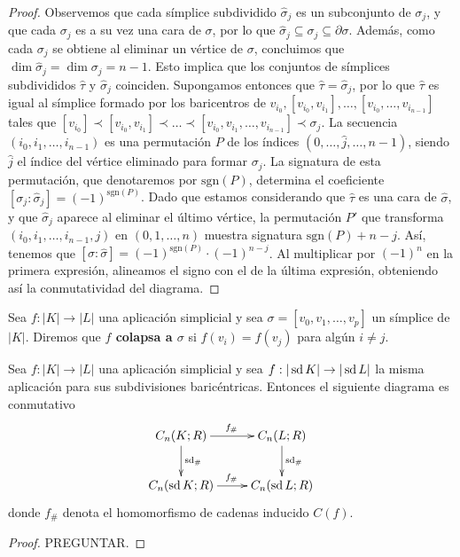 \begin{proof}
	Observemos que cada símplice subdividido $\widehat{\sigma}_j$ es un subconjunto de $\sigma_j$, y que cada $\sigma_j$ es a su vez una cara de $\sigma$, por lo que $\widehat{\sigma}_j \subseteq \sigma_j \subseteq \partial \sigma$. Además, como cada $\sigma_j$ se obtiene al eliminar un vértice de $\sigma$, concluimos que $\dim \widehat{\sigma}_j = \dim \sigma_j = n-1$. 
	Esto implica que los conjuntos de símplices subdivididos $\widehat{\tau}$ y $\widehat{\sigma}_j$ coinciden. Supongamos entonces que $\widehat{\tau} = \widehat{\sigma}_j$, por lo que $\widehat{\tau}$ es igual al símplice formado por los baricentros de $v_{i_0}, [v_{i_0}, v_{i_1}],\ldots, [v_{i_0}, \ldots, v_{i_{n-1}}]$ tales que $[v_{i_0}] \prec [v_{i_0}, v_{i_1}] \prec \ldots \prec [v_{i_0}, v_{i_1}, \ldots, v_{i_{n-1}}] \prec \sigma_j$.
	La secuencia $(i_0, i_1, \ldots, i_{n-1})$ es una permutación $P$ de los índices $(0, \ldots, \widehat{j}, \ldots, n-1)$, siendo $\widehat{j}$ el índice del vértice eliminado para formar $\sigma_j$. La signatura de esta permutación, que denotaremos por $\text{sgn}(P)$, determina el coeficiente $[\sigma_j : \widehat{\sigma}_j] = (-1)^{\text{sgn}(P)}$. 
	Dado que estamos considerando que $\widehat{\tau}$ es una cara de $\widehat{\sigma}$, y que $\widehat{\sigma}_j$ aparece al eliminar el último vértice, la permutación $P'$ que transforma $(i_0, i_1, \ldots, i_{n-1}, j)$ en $(0, 1, \ldots, n)$ muestra signatura $\text{sgn}(P) + n - j$. Así, tenemos que $[\sigma : \widehat{\sigma}] = (-1)^{\text{sgn}(P)} \cdot (-1)^{n - j}$. Al multiplicar por $(-1)^n$ en la primera expresión, alineamos el signo con el de la última expresión, obteniendo así la conmutatividad del diagrama.
\end{proof}

\begin{definicion}
	Sea $f : |K| \to |L|$ una aplicación simplicial y sea $\sigma = [v_0, v_1, \dots, v_p]$ un símplice de $|K|$. Diremos que \textbf{$f$ colapsa a $\sigma$} si $f(v_i) = f(v_j)$ para algún $i \neq j$.
\end{definicion}

\begin{lema}
	\label{lem:subdiv_cadenas}
	Sea $f: |K| \to |L|$ una aplicación simplicial y sea $f: |\operatorname{sd} K| \to |\operatorname{sd} L|$ la misma aplicación para sus subdivisiones baricéntricas. Entonces el siguiente diagrama es conmutativo
	\[
		\xymatrix{
			C_n(K;R) \ar@{->}[d]^{\sd_\#} \ar@{->}[r]^{f_\#} & C_n(L;R) \ar@{->}[d]^{\sd_\#} \\
			C_n(\sd K;R) \ar@{->}[r]^{f_\#} & C_n(\sd L;R)
		}
	\]
	donde $f_\#$ denota el homomorfismo de cadenas inducido $C(f)$.
\end{lema}
\begin{proof}
	PREGUNTAR.
\end{proof}

